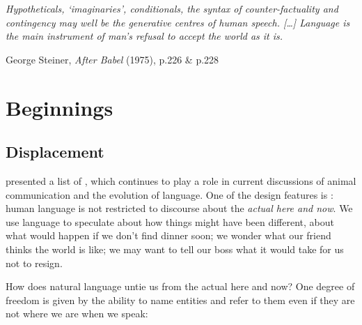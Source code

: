 \cleartoevenpage
\thispagestyle{empty}
\vspace*{\fill}

\noindent\emph{Hypotheticals, `imaginaries', conditionals, the syntax of
  counter-factuality and contingency may well be the generative centres of human
  speech. [\dots] Language is the main instrument of man's refusal to accept the
  world as it is.}

\medskip
\noindent George Steiner, \emph{After Babel} (1975), p.226 \& p.228
\nocite{steiner-1975-babel}

\vfill\vfill\null

\chapter{Beginnings}\label{cha:beginnings}

\minitoc

\section{Displacement}\label{sec:displacement}

\cite{hockett-1960-logical-considerations} presented a list of , which continues to play a role in current
discussions of animal communication and the evolution of language. One of the
design features is : human language is not restricted to
discourse about the \emph{actual here and now}. %
%
We use language to speculate about how things might have
been different, about what would happen if we don't find dinner soon; we wonder
what our friend thinks the world is like; we may want to tell our boss what it
would take for us not to resign.

How does natural language untie us from the actual here and now? One degree of
freedom is given by the ability to name entities and refer to them even if they
are not where we are when we speak:

